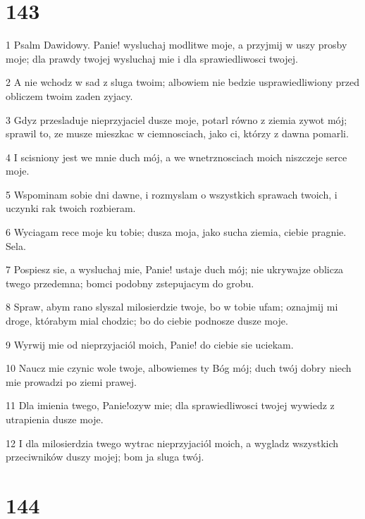 \chapter{143}

\par 1 Psalm Dawidowy. Panie! wysluchaj modlitwe moje, a przyjmij w uszy prosby moje; dla prawdy twojej wysluchaj mie i dla sprawiedliwosci twojej.
\par 2 A nie wchodz w sad z sluga twoim; albowiem nie bedzie usprawiedliwiony przed obliczem twoim zaden zyjacy.
\par 3 Gdyz przesladuje nieprzyjaciel dusze moje, potarl równo z ziemia zywot mój; sprawil to, ze musze mieszkac w ciemnosciach, jako ci, którzy z dawna pomarli.
\par 4 I scisniony jest we mnie duch mój, a we wnetrznosciach moich niszczeje serce moje.
\par 5 Wspominam sobie dni dawne, i rozmyslam o wszystkich sprawach twoich, i uczynki rak twoich rozbieram.
\par 6 Wyciagam rece moje ku tobie; dusza moja, jako sucha ziemia, ciebie pragnie. Sela.
\par 7 Pospiesz sie, a wysluchaj mie, Panie! ustaje duch mój; nie ukrywajze oblicza twego przedemna; bomci podobny zstepujacym do grobu.
\par 8 Spraw, abym rano slyszal milosierdzie twoje, bo w tobie ufam; oznajmij mi droge, którabym mial chodzic; bo do ciebie podnosze dusze moje.
\par 9 Wyrwij mie od nieprzyjaciól moich, Panie! do ciebie sie uciekam.
\par 10 Naucz mie czynic wole twoje, albowiemes ty Bóg mój; duch twój dobry niech mie prowadzi po ziemi prawej.
\par 11 Dla imienia twego, Panie!ozyw mie; dla sprawiedliwosci twojej wywiedz z utrapienia dusze moje.
\par 12 I dla milosierdzia twego wytrac nieprzyjaciól moich, a wygladz wszystkich przeciwników duszy mojej; bom ja sluga twój.

\chapter{144}

